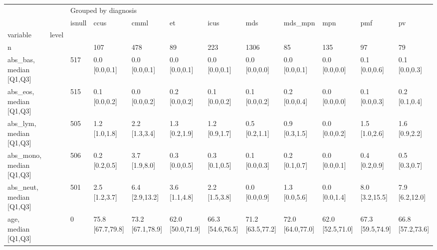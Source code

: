 \begin{tabular}{llllllllllll}
\toprule
                 &    & \multicolumn{10}{l}{Grouped by diagnosis} \\
                 &    &               isnull &                ccus &               cmml &                   et &                icus &               mds &           mds\_mpn &               mpn &                 pmf &                   pv \\
variable & level &                      &                     &                    &                      &                     &                   &                   &                   &                     &                      \\
\midrule
n &    &                      &                 107 &                478 &                   89 &                 223 &              1306 &                85 &               135 &                  97 &                   79 \\
abs\_bas, median [Q1,Q3] &    &                  517 &       0.0 [0.0,0.1] &      0.0 [0.0,0.1] &        0.0 [0.0,0.1] &       0.0 [0.0,0.1] &     0.0 [0.0,0.0] &     0.0 [0.0,0.1] &     0.0 [0.0,0.0] &       0.1 [0.0,0.6] &        0.1 [0.0,0.3] \\
abs\_eos, median [Q1,Q3] &    &                  515 &       0.1 [0.0,0.2] &      0.0 [0.0,0.2] &        0.2 [0.0,0.2] &       0.1 [0.0,0.2] &     0.1 [0.0,0.2] &     0.2 [0.0,0.4] &     0.0 [0.0,0.0] &       0.1 [0.0,0.3] &        0.2 [0.1,0.4] \\
abs\_lym, median [Q1,Q3] &    &                  505 &       1.2 [1.0,1.8] &      2.2 [1.3,3.4] &        1.3 [0.2,1.9] &       1.2 [0.9,1.7] &     0.5 [0.2,1.1] &     0.9 [0.3,1.5] &     0.0 [0.0,0.2] &       1.5 [1.0,2.6] &        1.6 [0.9,2.2] \\
abs\_mono, median [Q1,Q3] &    &                  506 &       0.2 [0.2,0.5] &      3.7 [1.9,8.0] &        0.3 [0.0,0.5] &       0.3 [0.1,0.5] &     0.1 [0.0,0.3] &     0.2 [0.1,0.7] &     0.0 [0.0,0.1] &       0.4 [0.2,0.9] &        0.5 [0.3,0.7] \\
abs\_neut, median [Q1,Q3] &    &                  501 &       2.5 [1.2,3.7] &     6.4 [2.9,13.2] &        3.6 [1.1,4.8] &       2.2 [1.5,3.8] &     0.0 [0.0,0.9] &     1.3 [0.0,5.6] &     0.0 [0.0,1.4] &      8.0 [3.2,15.5] &       7.9 [6.2,12.0] \\
age, median [Q1,Q3] &    &                    0 &    75.8 [67.7,79.8] &   73.2 [67.1,78.9] &     62.0 [50.0,71.9] &    66.3 [54.6,76.5] &  71.2 [63.5,77.2] &  72.0 [64.0,77.0] &  62.0 [52.5,71.0] &    67.3 [59.5,74.9] &     66.8 [57.2,73.6] \\

\end{tabular}
